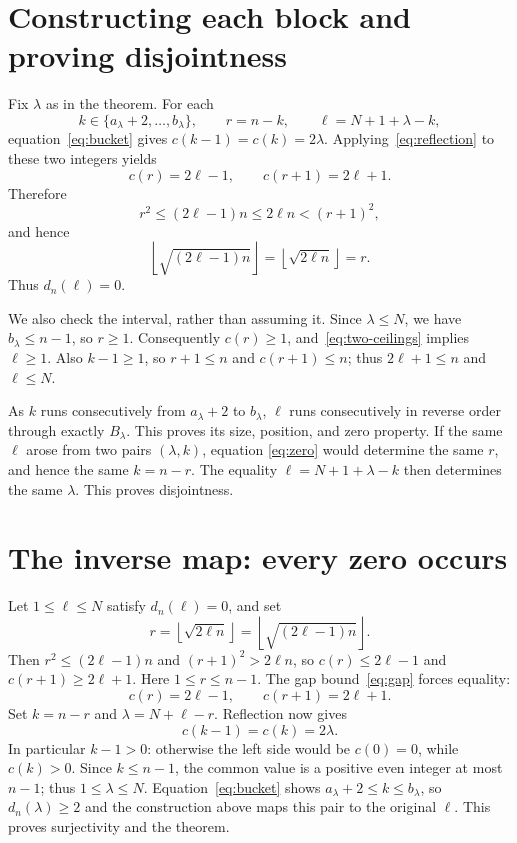 \documentclass[11pt]{article}
\newcommand{\fl}[1]{\left\lfloor #1\right\rfloor}
\begin{document}
\section*{Constructing each block and proving disjointness}
Fix $\lambda$ as in the theorem. For each
\[
 k\in\{a_\lambda+2,\ldots,b_\lambda\},
 \qquad r=n-k,
 \qquad \ell=N+1+\lambda-k,
\]
equation~\eqref{eq:bucket} gives $c(k-1)=c(k)=2\lambda$.
Applying~\eqref{eq:reflection} to these two integers yields
\begin{equation}\label{eq:two-ceilings}
 c(r)=2\ell-1,\qquad c(r+1)=2\ell+1.
\end{equation}
Therefore
\[
 r^2\le(2\ell-1)n\le2\ell n<(r+1)^2,
\]
and hence
\begin{equation}\label{eq:zero}
 \fl{\sqrt{(2\ell-1)n}}=\fl{\sqrt{2\ell n}}=r.
\end{equation}
Thus $d_n(\ell)=0$.

We also check the interval, rather than assuming it. Since
$\lambda\le N$, we have $b_\lambda\le n-1$, so $r\ge1$.
Consequently $c(r)\ge1$, and~\eqref{eq:two-ceilings} implies $\ell\ge1$.
Also $k-1\ge1$, so $r+1\le n$ and $c(r+1)\le n$;
thus $2\ell+1\le n$ and $\ell\le N$.

As $k$ runs consecutively from $a_\lambda+2$ to $b_\lambda$,
$\ell$ runs consecutively in reverse order through exactly $B_\lambda$.
This proves its size, position, and zero property.
If the same $\ell$ arose from two pairs $(\lambda,k)$, equation
\eqref{eq:zero} would determine the same $r$, and hence the same
$k=n-r$. The equality $\ell=N+1+\lambda-k$ then determines the same
$\lambda$. This proves disjointness.

\section*{The inverse map: every zero occurs}
Let $1\le\ell\le N$ satisfy $d_n(\ell)=0$, and set
\[
 r=\fl{\sqrt{2\ell n}}=\fl{\sqrt{(2\ell-1)n}}.
\]
Then $r^2\le(2\ell-1)n$ and $(r+1)^2>2\ell n$, so
$c(r)\le2\ell-1$ and $c(r+1)\ge2\ell+1$.
Here $1\le r\le n-1$. The gap bound~\eqref{eq:gap} forces equality:
\[
 c(r)=2\ell-1,\qquad c(r+1)=2\ell+1.
\]
Set $k=n-r$ and $\lambda=N+\ell-r$. Reflection now gives
\[
 c(k-1)=c(k)=2\lambda.
\]
In particular $k-1>0$: otherwise the left side would be $c(0)=0$,
while $c(k)>0$. Since $k\le n-1$, the common value is a positive
even integer at most $n-1$; thus $1\le\lambda\le N$.
Equation~\eqref{eq:bucket} shows $a_\lambda+2\le k\le b_\lambda$,
so $d_n(\lambda)\ge2$ and the construction above maps this pair to
the original $\ell$. This proves surjectivity and the theorem.
\end{document}
